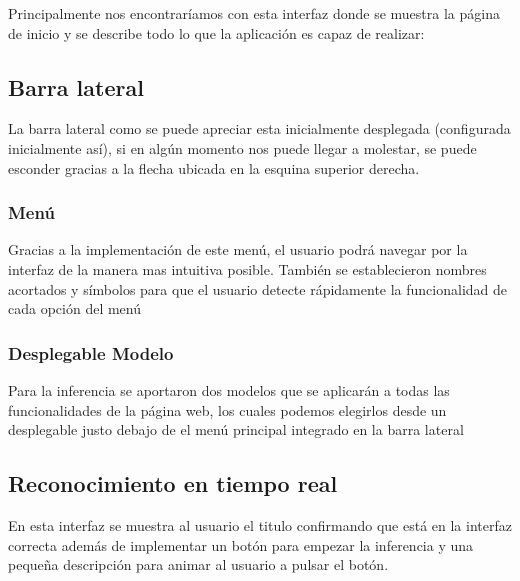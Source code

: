 
Principalmente nos encontraríamos con esta interfaz donde se muestra la página de inicio y se describe todo lo que la aplicación es capaz de realizar:



\subsection{Barra lateral}

La barra lateral como se puede apreciar esta inicialmente desplegada (configurada inicialmente así), si en algún momento nos puede llegar a molestar, se puede esconder gracias a la flecha ubicada en la esquina superior derecha.


\subsubsection{Menú}
Gracias a la implementación de este menú, el usuario podrá navegar por la interfaz de la manera mas intuitiva posible. También se establecieron nombres acortados y símbolos para que el usuario detecte rápidamente la funcionalidad de cada opción del menú


\subsubsection{Desplegable Modelo}
Para la inferencia se aportaron dos modelos que se aplicarán a todas las funcionalidades de la página web, los cuales podemos elegirlos desde un desplegable justo debajo de el menú principal integrado en la barra lateral


\subsection{Reconocimiento en tiempo real}
En esta interfaz se muestra al usuario el titulo confirmando que está en la interfaz correcta además de implementar un botón para empezar la inferencia y una pequeña descripción para animar al usuario a pulsar el botón.

